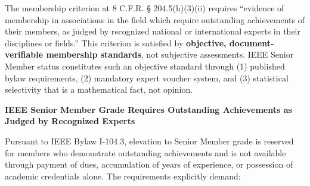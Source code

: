 The membership criterion at 8 C.F.R. § 204.5(h)(3)(ii) requires ``evidence of membership in associations in the field which require outstanding achievements of their members, as judged by recognized national or international experts in their disciplines or fields.'' This criterion is satisfied by \textbf{objective, document-verifiable membership standards}, not subjective assessments. IEEE Senior Member status constitutes such an objective standard through (1) published bylaw requirements, (2) mandatory expert voucher system, and (3) statistical selectivity that is a mathematical fact, not opinion.

\textbf{IEEE Senior Member Grade Requires Outstanding Achievements as Judged by Recognized Experts}

Pursuant to IEEE Bylaw I-104.3, elevation to Senior Member grade is reserved for members who demonstrate outstanding achievements and is not available through payment of dues, accumulation of years of experience, or possession of academic credentials alone. The requirements explicitly demand:

